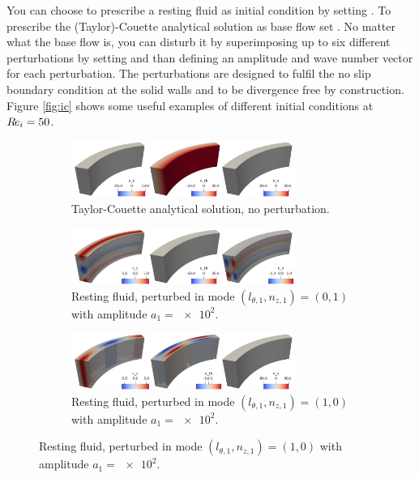 \documentclass[a4paper, 11pt, DIV=11]{scrartcl}
\begin{document}
You can choose to prescribe a resting fluid as initial condition by
setting . To prescribe the (Taylor)-Couette
analytical solution as base flow set . No matter
what the base flow is, you can disturb it by superimposing up to
six different perturbations by setting  and than
defining an amplitude and wave number vector for each perturbation.
The perturbations are designed to fulfil the no slip boundary
condition at the solid walls and to be divergence free by construction.
Figure \ref{fig:ic} shows some useful examples of different initial
conditions at $R\hspace{-0.1em}e_{i}=\num{50}$.
\begin{figure}
\begin{subfigure}{1.0\textwidth}
\centering
\includegraphics[width=0.8\textwidth]{figures/tc0039/icTaylorCouette.png}
\caption{Taylor-Couette analytical solution, no perturbation.}
\label{fig:tc0039icTayolorCouette}
\end{subfigure}
\vfill
\begin{subfigure}{1.0\textwidth}
\centering
\includegraphics[width=0.8\textwidth]{figures/tc0039/icPerturb01.png}
\caption{Resting fluid, perturbed in mode $(l_{\theta,1}, n_{z,1})=(0,1)$
with amplitude $a_{1}=\num{e2}$.}
\label{fig:tc0039icPerturb01}
\end{subfigure}
\vfill
\begin{subfigure}{1.0\textwidth}
\centering
\includegraphics[width=0.8\textwidth]{figures/tc0039/icPerturb10.png}
\caption{Resting fluid, perturbed in mode $(l_{\theta,1}, n_{z,1})=(1,0)$
with amplitude $a_{1}=\num{e2}$.}
\label{fig:tc0039icPerturb10}
\end{subfigure}

\end{figure}
\end{document}
